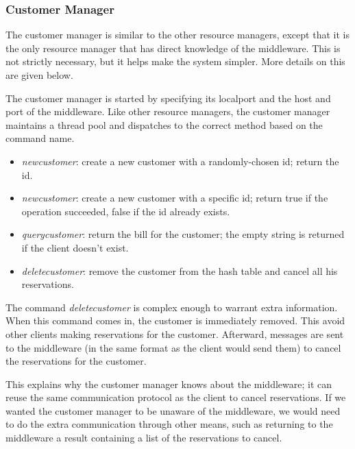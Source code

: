 \documentclass[11pt]{article}
\begin{document}
\subsubsection{Customer Manager}

The customer manager is similar to the other resource managers, except
that it is the only resource manager that has direct knowledge of the
middleware.  This is not strictly necessary, but it helps make the
system simpler.  More details on this are given below.

The customer manager is started by specifying its localport and the
host and port of the middleware.  Like other resource managers, the
customer manager maintains a thread pool and dispatches to the correct
method based on the command name.


\begin{itemize}
\item {\it newcustomer}: create a new customer with a randomly-chosen
  id; return the id.
\item {\it newcustomer}: create a new customer with a specific id;
  return true if the operation succeeded, false if the id already exists.
\item {\it querycustomer}: return the bill for the customer; the empty
  string is returned if the client doesn't exist.
\item {\it deletecustomer}: remove the customer from the hash table
  and cancel all his reservations.
\end{itemize}

The command {\it deletecustomer} is complex enough to warrant extra
information.  When this command comes in, the customer is immediately
removed.  This avoid other clients making reservations for the
customer. Afterward, messages are sent to the middleware (in the same
format as the client would send them) to cancel the reservations for
the customer.

This explains why the customer manager knows about the middleware; it
can reuse the same communication protocol as the client to cancel
reservations.  If we wanted the customer manager to be unaware of the
middleware, we would need to do the extra communication through other
means, such as returning to the middleware a result containing a list
of the reservations to cancel.
\end{document}
